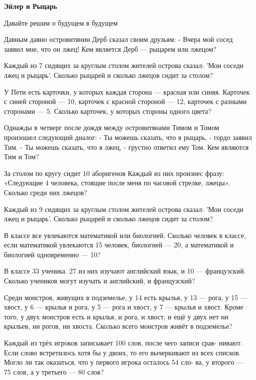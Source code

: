 \centerline{\bf \Huge Эйлер и Рыцарь}


\begin{flushright}
        \scriptsize{Давайте решим о будущем в будущем}
\end{flushright}

Давным давно островитянин Дерб сказал своим друзьям: - Вчера мой сосед заявил мне, что он лжец! Кем является Дерб — рыцарем или лжецом?

Каждый из 7 сидящих за круглым столом жителей острова сказал: 'Мои соседи лжец и рыцарь'. Сколько рыцарей и сколько лжецов сидит за столом?

У Пети есть карточки, у которых каждая сторона — красная или синяя. Карточек с синей стороной — 10, карточек с красной стороной — 12, карточек с разными сторонами — 5. Сколько карточек, у которых стороны одного цвета?

Однажды в четверг после дождя между островитянами Тимом и Томом произошел следующий диалог: - Ты можешь сказать, что я рыцарь, - гордо заявил Тим. - Ты можешь сказать, что я лжец, - грустно ответил ему Том. Кем являются Тим и Том?

За столом по кругу сидит 10 аборигенов Каждый из них произнес фразу: «Следующие 4 человека, стоящие после меня по часовой стрелке, лжецы». Сколько среди них лжецов?

Каждый из 9 сидящих за круглым столом жителей острова сказал: 'Мои соседи лжец и рыцарь'. Сколько рыцарей и сколько лжецов сидит за столом?

В классе все увлекаются математикой или биологией. Сколько человек в классе, если математикой увлекаются 15 человек, биологией — 20, а математикой и биологией одновременно — 10?


В классе 33 ученика. 27 из них изучают английский язык, и 10 — французский. Сколько учеников могут изучать и английский, и французский?



Среди монстров, живущих в подземелье, у 14 есть крылья, у 13 — рога, у 15 — хвост, у 6 — крылья и рога, у 5 — рога и хвост, у 7 — крылья и хвост. Кроме того, у двух монстров есть и крылья, и рога, и хвост, и ещё у двух нет ни крыльев, ни рогов, ни хвоста. Сколько всего монстров живёт в подземелье?

Каждый из трёх игроков записывает 100 слов, после чего записи срав- нивают. Если слово встретилось хотя бы у двоих, то его вычеркивают из всех списков. Могло ли так оказаться, что у первого игрока осталось 54 сло- ва, у второго — 75 слов, а у третьего — 80 слов?
